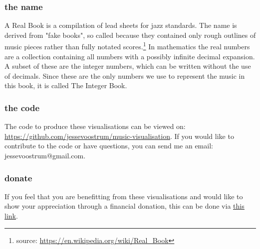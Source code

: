 \subsubsection*{the name}
A Real Book is a compilation of lead sheets for jazz standards. The name is derived from "fake books", so called because they contained only rough outlines of music pieces rather than fully notated scores.\footnote{source: \url{https://en.wikipedia.org/wiki/Real_Book}} In mathematics the real numbers are a collection containing all numbers with a possibly infinite decimal expansion. A subset of these are the integer numbers, which can be written without the use of decimals. Since these are the only numbers we use to represent the music in this book, it is called The Integer Book.

\subsubsection*{the code}
The code to produce these visualisations can be viewed on: \url{https://github.com/jessevoostrum/music-visualisation}. If you would like to contribute to the code or have questions, you can send me an email: jessevoostrum@gmail.com.

\subsubsection*{donate}
If you feel that you are benefitting from these visualisations and would like to show your appreciation through a financial donation, this can be done via \href{https://www.paypal.com/cgi-bin/webscr?cmd=_donations&business=jessevoostrum@gmail.com&no_shipping=1&no_note=1&tax=0&currency_code=EUR&lc=US&bn=PP_DonationsBF}{\underline{this link}}. 